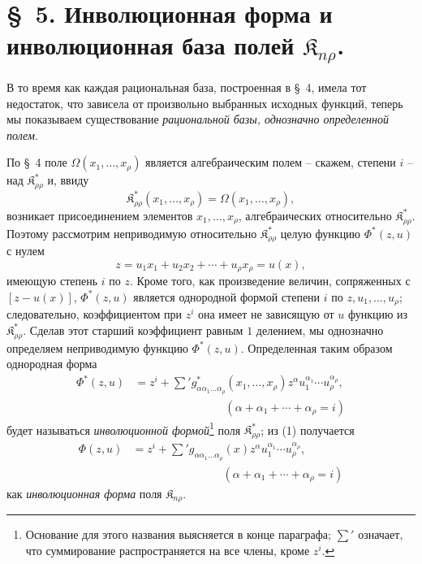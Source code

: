 \documentclass[11pt]{article}
\providecommand{\Kfield}{\mathfrak{K}}
\begin{document}
\section*{\S\ 5. Инволюционная форма и инволюционная база полей $\Kfield_{n\rho}$.}

В то время как каждая рациональная база, построенная в \S\ 4, имела тот недостаток, что зависела от произвольно выбранных исходных функций, теперь мы показываем существование \emph{рациональной базы, однозначно определенной полем}.

По \S\ 4 поле $\Omega(x_1,\ldots,x_\rho)$ является алгебраическим полем -- скажем, степени $i$ -- над $\Kfield^*_{\rho\rho}$ и, ввиду
\[
  \Kfield^*_{\rho\rho}(x_1,
  \ldots,x_\rho)=\Omega(x_1,\ldots,x_\rho),
\]
возникает присоединением элементов $x_1,\ldots,x_\rho$, алгебраических относительно $\Kfield^*_{\rho\rho}$. Поэтому рассмотрим неприводимую относительно $\Kfield^*_{\rho\rho}$ целую функцию $\Phi^*(z,u)$ с нулем
\[
  z=u_1x_1+u_2x_2+\cdots+u_\rho x_\rho=u(x),
\]
имеющую степень $i$ по $z$. Кроме того, как произведение величин, сопряженных с $[z-u(x)]$, $\Phi^*(z,u)$ является однородной формой степени $i$ по $z,u_1,\ldots,u_\rho$; следовательно, коэффициентом при $z^i$ она имеет не зависящую от $u$ функцию из $\Kfield^*_{\rho\rho}$. Сделав этот старший коэффициент равным $1$ делением, мы однозначно определяем неприводимую функцию $\Phi^*(z,u)$. Определенная таким образом однородная форма
\begin{equation}
\begin{aligned}
  \Phi^*(z,u)
  &=z^i+
    \sum{}' g^*_{\alpha\alpha_1\ldots\alpha_\rho}(x_1,
    \ldots,x_\rho)
    z^\alpha u_1^{\alpha_1}\cdots u_\rho^{\alpha_\rho},\\
  &\hspace{8em}(\alpha+\alpha_1+\cdots+\alpha_\rho=i)
\end{aligned}
\tag{1}
\end{equation}
будет называться \emph{инволюционной формой}\footnote{Основание для этого названия выясняется в конце параграфа; $\sum'$ означает, что суммирование распространяется на все члены, кроме $z^i$.} поля $\Kfield^*_{\rho\rho}$; из (1) получается
\begin{equation}
\begin{aligned}
  \Phi(z,u)
  &=z^i+
    \sum{}' g_{\alpha\alpha_1\ldots\alpha_\rho}(x)
    z^\alpha u_1^{\alpha_1}\cdots u_\rho^{\alpha_\rho},\\
  &\hspace{8em}(\alpha+\alpha_1+\cdots+\alpha_\rho=i)
\end{aligned}
\tag{2}
\end{equation}
как \emph{инволюционная форма} поля $\Kfield_{n\rho}$.
\end{document}

